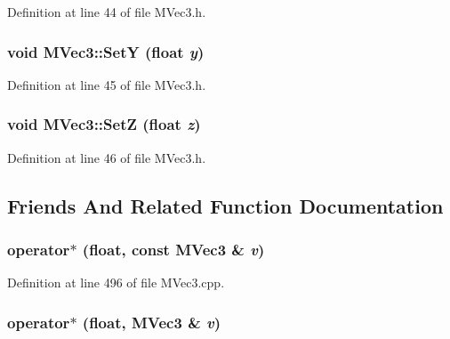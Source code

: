 Definition at line 44 of file MVec3.h.\hypertarget{class_m_vec3_128947a1f8cbc74a87b3b66454dfbb86}{
\subsubsection[{SetY}]{\setlength{\rightskip}{0pt plus 5cm}void MVec3::SetY (float {\em y})}}
\label{class_m_vec3_128947a1f8cbc74a87b3b66454dfbb86}




Definition at line 45 of file MVec3.h.\hypertarget{class_m_vec3_bf45cf723890eedc23d0aa9eaf4a578a}{
\subsubsection[{SetZ}]{\setlength{\rightskip}{0pt plus 5cm}void MVec3::SetZ (float {\em z})}}
\label{class_m_vec3_bf45cf723890eedc23d0aa9eaf4a578a}




Definition at line 46 of file MVec3.h.

\subsection{Friends And Related Function Documentation}
\hypertarget{class_m_vec3_c6a8f85e2fbf1a5ad503486a8598292b}{
\subsubsection[{operator$\ast$}]{ operator$\ast$ (float, \/  const {\bf MVec3} \& {\em v})}}
\label{class_m_vec3_c6a8f85e2fbf1a5ad503486a8598292b}




Definition at line 496 of file MVec3.cpp.\hypertarget{class_m_vec3_768f36f4b6204f86f0581112b603ffdb}{
\subsubsection[{operator$\ast$}]{ operator$\ast$ (float, \/  {\bf MVec3} \& {\em v})}}
\label{class_m_vec3_768f36f4b6204f86f0581112b603ffdb}




